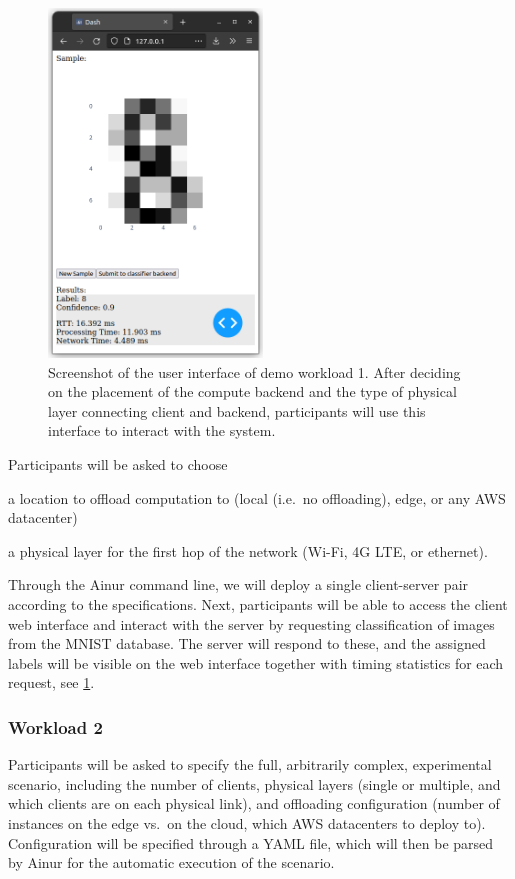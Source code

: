 \begin{figure}
    \centering
    \includegraphics[height=25em]{publications/2022Ainur/figures/demo_mockup}
    \caption{Screenshot of the user interface of demo workload 1. After deciding on the placement of the compute backend and the type of physical layer connecting client and backend, participants will use this interface to interact with the system.}\label{paper:olguinmunoz2022airnur:fig:mockup}
\end{figure}

Participants will be asked to choose
\begin{enumerate*}[itemjoin={{; }}, itemjoin*={{; and }}]
    \item a location to offload computation to (local (i.e.\ no offloading), edge, or any \gls{AWS} datacenter)
    \item a physical layer for the first hop of the network (Wi-Fi, 4G \gls{LTE}, or ethernet).
\end{enumerate*}
Through the Ainur command line, we will deploy a single client-server pair according to the specifications.
Next, participants will be able to access the client web interface and interact with the server by requesting classification of images from the \gls{MNIST} database.
The server will respond to these, and the assigned labels will be visible on the web interface together with timing statistics for each request, see \cref{paper:olguinmunoz2022airnur:fig:mockup}.

\subsubsection{Workload 2}

Participants will be asked to specify the full, arbitrarily complex, experimental scenario, including the number of clients, physical layers (single or multiple, and which clients are on each physical link), and offloading configuration (number of instances on the edge vs.\ on the cloud, which \gls{AWS} datacenters to deploy to).
Configuration will be specified through a \gls{YAML} file, which will then be parsed by Ainur for the automatic execution of the scenario.
